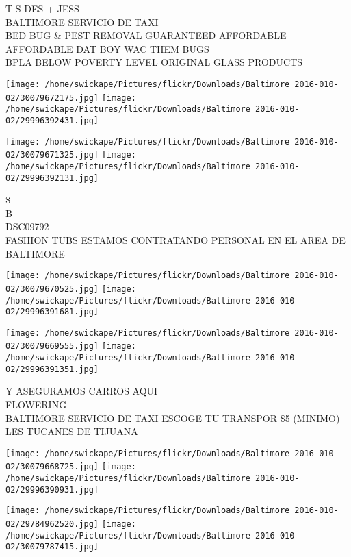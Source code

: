 \documentclass[10pt,letterpaper]{article}
\begin{document}
T S DES + JESS\\
BALTIMORE SERVICIO DE TAXI\\
BED BUG \& PEST REMOVAL GUARANTEED AFFORDABLE AFFORDABLE DAT BOY WAC THEM BUGS\\
BPLA BELOW POVERTY LEVEL ORIGINAL GLASS PRODUCTS\\
\pagebreak

\texttt{[image: /home/swickape/Pictures/flickr/Downloads/Baltimore 2016-010-02/30079672175.jpg]}
\texttt{[image: /home/swickape/Pictures/flickr/Downloads/Baltimore 2016-010-02/29996392431.jpg]}

\texttt{[image: /home/swickape/Pictures/flickr/Downloads/Baltimore 2016-010-02/30079671325.jpg]}
\texttt{[image: /home/swickape/Pictures/flickr/Downloads/Baltimore 2016-010-02/29996392131.jpg]}

\$\\
B\\
DSC09792\\
FASHION TUBS ESTAMOS CONTRATANDO PERSONAL EN EL AREA DE BALTIMORE\\
\pagebreak

\texttt{[image: /home/swickape/Pictures/flickr/Downloads/Baltimore 2016-010-02/30079670525.jpg]}
\texttt{[image: /home/swickape/Pictures/flickr/Downloads/Baltimore 2016-010-02/29996391681.jpg]}

\texttt{[image: /home/swickape/Pictures/flickr/Downloads/Baltimore 2016-010-02/30079669555.jpg]}
\texttt{[image: /home/swickape/Pictures/flickr/Downloads/Baltimore 2016-010-02/29996391351.jpg]}

Y ASEGURAMOS CARROS AQUI\\
FLOWERING\\
BALTIMORE SERVICIO DE TAXI ESCOGE TU TRANSPOR \$5 (MINIMO)\\
LES TUCANES DE TIJUANA\\
\pagebreak

\texttt{[image: /home/swickape/Pictures/flickr/Downloads/Baltimore 2016-010-02/30079668725.jpg]}
\texttt{[image: /home/swickape/Pictures/flickr/Downloads/Baltimore 2016-010-02/29996390931.jpg]}

\texttt{[image: /home/swickape/Pictures/flickr/Downloads/Baltimore 2016-010-02/29784962520.jpg]}
\texttt{[image: /home/swickape/Pictures/flickr/Downloads/Baltimore 2016-010-02/30079787415.jpg]}
\end{document}
